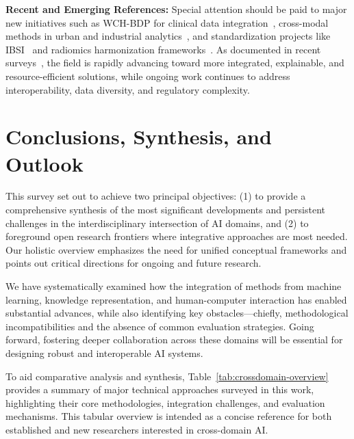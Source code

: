 \documentclass[sigconf]{acmart}
\begin{document}
\textbf{Recent and Emerging References:} Special attention should be paid to major new initiatives such as WCH-BDP for clinical data integration~\cite{ref36,ref84}, cross-modal methods in urban and industrial analytics~\cite{ref33,ref76,ref77}, and standardization projects like IBSI~\cite{ref44,ref45} and radiomics harmonization frameworks~\cite{ref104}. As documented in recent surveys~\cite{ref51,ref54,ref90,ref106,ref107}, the field is rapidly advancing toward more integrated, explainable, and resource-efficient solutions, while ongoing work continues to address interoperability, data diversity, and regulatory complexity.

\section{Conclusions, Synthesis, and Outlook}

This survey set out to achieve two principal objectives: (1) to provide a comprehensive synthesis of the most significant developments and persistent challenges in the interdisciplinary intersection of AI domains, and (2) to foreground open research frontiers where integrative approaches are most needed. Our holistic overview emphasizes the need for unified conceptual frameworks and points out critical directions for ongoing and future research.

We have systematically examined how the integration of methods from machine learning, knowledge representation, and human-computer interaction has enabled substantial advances, while also identifying key obstacles—chiefly, methodological incompatibilities and the absence of common evaluation strategies. Going forward, fostering deeper collaboration across these domains will be essential for designing robust and interoperable AI systems.

To aid comparative analysis and synthesis, Table~\ref{tab:crossdomain-overview} provides a summary of major technical approaches surveyed in this work, highlighting their core methodologies, integration challenges, and evaluation mechanisms. This tabular overview is intended as a concise reference for both established and new researchers interested in cross-domain AI.
\end{document}
